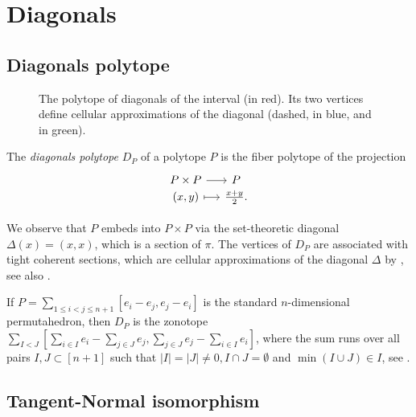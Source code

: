 
\section{Diagonals}


\subsection{Diagonals polytope}

\begin{figure}[b]
	\centering
	
	\caption{The polytope of diagonals of the interval (in red). Its two vertices define cellular approximations of the diagonal (dashed, in blue, and in green).}
	\label{figure:cellularapproximation}
\end{figure}

\begin{definition}
	The \emph{diagonals polytope} $D_P$ of a polytope $P$ is the fiber polytope of the projection
	\[
	\begin{tikzcd}[row sep=-2,column sep=small]
		P \times P \arrow[r] & P \\
		(x,y) \arrow[r,mapsto] &\textstyle\frac{x+y}{2}.
	\end{tikzcd}
	\]
\end{definition}

We observe that $P$ embeds into $P\times P$ via the set-theoretic diagonal $\Delta (x)=(x,x)$, which is a section of $\pi$.
The vertices of $D_P$ are associated with tight coherent sections, which are cellular approximations of the diagonal $\Delta$ by \cite[Proposition 5]{MTTV19}, see also \cite[Proposition 1.1]{GLA21}.

\begin{example} \label{e:permutahedron}
	If $P=\sum_{1 \leq i<j \leq n+1} [e_i-e_j, e_j-e_i]$ is the standard $n$-dimensional permutahedron, then $D_P$ is the zonotope $\sum_{I<J} [\sum_{i \in I}e_i - \sum_{j \in J}e_j, \sum_{j \in J} e_j - \sum_{i \in I}e_i]$, where the sum runs over all pairs $I,J\subset [n+1]$ such that $|I|=|J|\neq 0, I\cap J = \emptyset$ and $\min(I \cup J) \in I$, see \cite[Theorem 3.6]{GLA21}.
\end{example}

\subsection{Tangent-Normal isomorphism}

